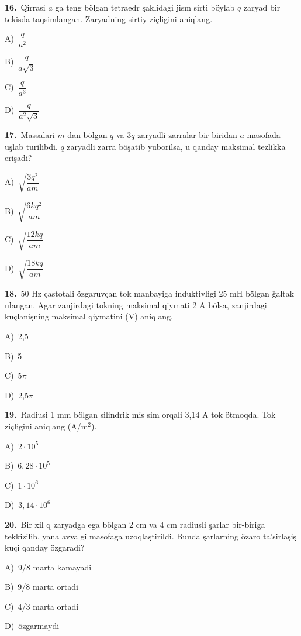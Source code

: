 \documentclass[11pt,a4paper]{article}
\newcommand{\opt}[2]{\hspace*{4mm}#1)\ #2\par}
\begin{document}
\noindent\begin{minipage}{\linewidth}
\textbf{16.}\ Qirrasi $a$ ga teng bölgan tetraedr şaklidagi jism sirti böylab $q$ zaryad bir tekisda taqsimlangan. Zaryadning sirtiy ziçligini aniqlang.\par\smallskip
\opt{A}{$\dfrac{q}{a^2}$}
\opt{B}{$\dfrac{q}{a\sqrt3}$}
\opt{C}{$\dfrac{q}{a^3}$}
\opt{D}{$\dfrac{q}{a^2\sqrt3}$}
\end{minipage}\vspace{9pt}\par
\noindent\begin{minipage}{\linewidth}
\textbf{17.}\ Massalari $m$ dan bölgan $q$ va $3q$ zaryadli zarralar bir biridan $a$ masofada uşlab turilibdi. $q$ zaryadli zarra böşatib yuborilsa, u qanday maksimal tezlikka erişadi?\par\smallskip
\opt{A}{$\sqrt{\dfrac{3q^2}{am}}$}
\opt{B}{$\sqrt{\dfrac{6kq^2}{am}}$}
\opt{C}{$\sqrt{\dfrac{12kq}{am}}$}
\opt{D}{$\sqrt{\dfrac{18kq}{am}}$}
\end{minipage}\vspace{9pt}\par
\noindent\begin{minipage}{\linewidth}
\textbf{18.}\ 50 Hz çastotali özgaruvçan tok manbayiga induktivligi 25 mH bölgan ğaltak ulangan. Agar zanjirdagi tokning maksimal qiymati 2 A bölsa, zanjirdagi kuçlanişning maksimal qiymatini (V) aniqlang.\par\smallskip
\opt{A}{2,5}
\opt{B}{5}
\opt{C}{5$\pi$}
\opt{D}{2,5$\pi$}
\end{minipage}\vspace{9pt}\par
\noindent\begin{minipage}{\linewidth}
\textbf{19.}\ Radiusi 1 mm bölgan silindrik mis sim orqali 3,14 A tok ötmoqda. Tok ziçligini aniqlang (A/m$^{2}$).\par\smallskip
\opt{A}{$2\cdot10^5$}
\opt{B}{$6{,}28\cdot10^5$}
\opt{C}{$1\cdot10^6$}
\opt{D}{$3{,}14\cdot10^6$}
\end{minipage}\vspace{9pt}\par
\noindent\begin{minipage}{\linewidth}
\textbf{20.}\ Bir xil q zaryadga ega bölgan 2 cm va 4 cm radiusli şarlar bir-biriga tekkizilib, yana avvalgi masofaga uzoqlaştirildi. Bunda şarlarning özaro ta’sirlaşiş kuçi qanday özgaradi?\par\smallskip
\opt{A}{9/8 marta kamayadi}
\opt{B}{9/8 marta ortadi}
\opt{C}{4/3 marta ortadi}
\opt{D}{özgarmaydi}
\end{minipage}\vspace{9pt}\par
\end{document}
